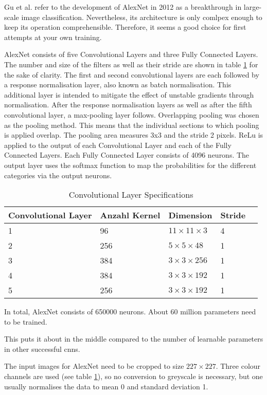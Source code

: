 Gu et al. \cite{Gu:2018} refer to the development of AlexNet in 2012 as a breakthrough in large-scale image classification. Nevertheless, its architecture is only comlpex enough to keep its operation comprehensible. Therefore, it seems a good choice for first attempts at your own training.


AlexNet consists of five Convolutional Layers and three Fully Connected Layers. The number and size of the filters as well as their stride are shown in table \ref{ConvAlex} for the sake of clarity. The first and second convolutional layers are each followed by a response normalisation layer, also known as batch normalisation. This additional layer is intended to mitigate the effect of unstable gradients through normalisation. After the response normalisation layers as well as after the fifth convolutional layer, a max-pooling layer follows. Overlapping pooling was chosen as the pooling method. This means that the individual sections to which pooling is applied overlap. The pooling area measures 3x3 and the stride 2 pixels. ReLu is applied to the output of each Convolutional Layer and each of the Fully Connected Layers. Each Fully Connected Layer consists of 4096 neurons. The output layer uses the softmax function to map the probabilities for the different categories via the output neurons. \cite{Krizhevsky:2012}\cite{Alake:2020}

\begin{table} [H]
\centering
	\begin{tabular} {l l l l l}
Convolutional Layer & Anzahl Kernel & Dimension & Stride \\ \hline
1 & 96 & $11\times11\times3$ & 4\\
2 & 256 & $5\times5\times48$ & 1\\
3 & 384 & $3\times3\times256$ & 1\\
4 & 384 & $3\times3\times192$ & 1\\
5 & 256 & $3\times3\times192$ & 1\\
\end{tabular}
\caption{Convolutional Layer Specifications}
\label{ConvAlex}
\end{table}

In total, AlexNet consists of 650000 neurons. About 60 million parameters need to be trained. \cite{Krizhevsky:2012}

This puts it about in the middle compared to the number of learnable parameters in other successful \ac{cnn}s.


The input images for AlexNet need to be cropped to size $227 \times 227$. Three colour channels are used (see table \ref{ConvAlex}), so no conversion to greyscale is necessary, but one usually normalises the data to mean 0 and standard deviation 1.\cite{Alake:2020}


